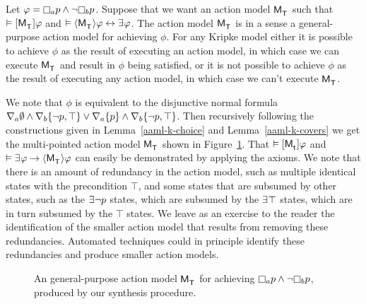\begin{example}
Let $\phi = \necessaryA \atomP \land \lnot \necessaryB \atomP$.
Suppose that we want an action model $\aPModel{\aStatesT}$
such that $\entails \actionA{\aPModel{\aStatesT}} \phi$
and $\entails \actionE{\aPModel{\aStatesT}} \phi \iff \someacts \phi$.
The action model $\aPModel{\aStatesT}$ is in a sense a general-purpose action model for achieving $\phi$.
For any Kripke model either it is possible to achieve $\phi$ as the result of executing an action model, in which case we can execute $\aPModel{\aStatesT}$ and result in $\phi$ being satisfied, or it is not possible to achieve $\phi$ as the result of executing any action model, in which case we can't execute $\aPModel{\aStatesT}$.

We note that $\phi$ is equivalent to the disjunctive normal formula $\nabla_{a} \emptyset \land \nabla_{b} \{\lnot p, \top\} \lor \nabla_{a} \{p\} \land \nabla_{b} \{\lnot p, \top\}$.
Then recursively following the constructions given in Lemma~\ref{aaml-k-choice} and Lemma~\ref{aaml-k-covers} we get the multi-pointed action model $\aPModel{\aStatesT}$ shown in Figure~\ref{aaml-k-example}.
That $\entails \actionA{\aPModel{\aStateT}} \phi$ and $\entails \somerefs \phi \implies \actionE{\aPModel{\aStatesT}} \phi$ can easily be demonstrated by applying the \axiomAmlK{} axioms.
We note that there is an amount of redundancy in the action model, such as multiple identical states with the precondition $\top$, and some states that are subsumed by other states, such as the $\someacts \lnot \atomP$ states, which are subsumed by the $\someacts \top$ states, which are in turn subsumed by the $\top$ states.
We leave as an exercise to the reader the identification of the smaller action model that results from removing these redundancies.
Automated techniques could in principle identify these redundancies and produce smaller action models.

\begin{figure}
    \caption{An general-purpose action model $\aPModel{\aStatesT}$ for achieving $\necessaryA \atomP \land \lnot \necessaryB \atomP$, produced by our synthesis procedure.}\label{aaml-k-example}
    \centering
\end{figure}
\end{example}

